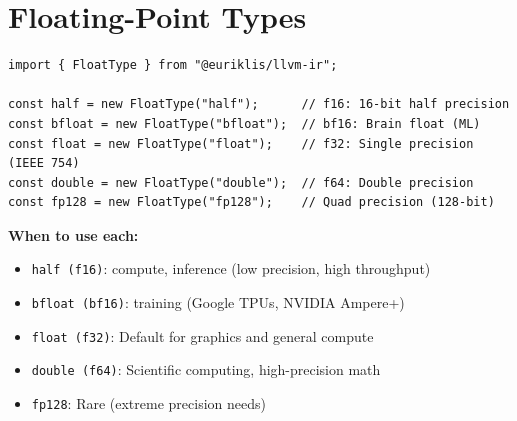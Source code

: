 \section{Floating-Point Types}

\begin{lstlisting}[style=ts]
import { FloatType } from "@euriklis/llvm-ir";

const half = new FloatType("half");      // f16: 16-bit half precision
const bfloat = new FloatType("bfloat");  // bf16: Brain float (ML)
const float = new FloatType("float");    // f32: Single precision (IEEE 754)
const double = new FloatType("double");  // f64: Double precision
const fp128 = new FloatType("fp128");    // Quad precision (128-bit)
\end{lstlisting}

\textbf{When to use each:}
\begin{itemize}[noitemsep]
  \item \texttt{half (f16)}:  compute,  inference (low precision, high throughput)
  \item \texttt{bfloat (bf16)}:  training (Google TPUs, NVIDIA Ampere+)
  \item \texttt{float (f32)}: Default for graphics and general compute
  \item \texttt{double (f64)}: Scientific computing, high-precision math
  \item \texttt{fp128}: Rare (extreme precision needs)
\end{itemize}

